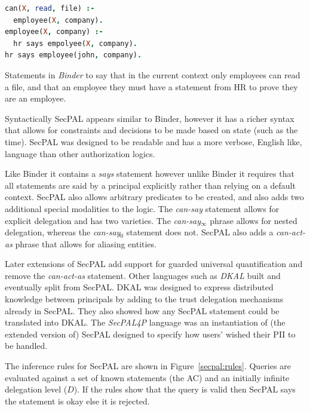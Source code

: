 \documentclass[a4paper,sfsidenotes]{tufte-book}
\begin{document}
\begin{marginfigure}\label{code:binder}
  \begin{lstlisting}[language=Prolog,morekeywords={*,says,:-}]
can(X, read, file) :- 
  employee(X, company).
employee(X, company) :- 
  hr says empolyee(X, company).
hr says employee(john, company).
  \end{lstlisting}
  \caption{Statements in \emph{Binder} to say that in the current context only
    employees can read a file, and that an employee they must have a statement
    from HR to prove they are an employee.}
\end{marginfigure}

Syntactically {SecPAL} appears similar to Binder, however it has a richer syntax
that allows for constraints and decisions to be made based on state (such as the
time). {SecPAL} was designed to be readable and has a more verbose, English like,
language than other authorization logics.

Like Binder it contains a \emph{says} statement however unlike Binder it
requires that all statements are said by a principal explicitly rather than
relying on a default context. {SecPAL} also allows arbitrary predicates to be
created, and also adds two additional special modalities to the logic. The
\emph{can-say} statement allows for explicit delegation and has two varieties.
The \emph{can-say$_\infty$} phrase allows for nested delegation, whereas the
\emph{can-say$_0$} statement does not. {SecPAL} also adds a \emph{can-act-as}
phrase that allows for aliasing entities.

Later extensions of {SecPAL}\cite{Becker:2009vt} add support for guarded
universal quantification and remove the \emph{can-act-as} statement. Other
languages such as \emph{DKAL}\cite{Gurevich:2008fz} built and eventually split
from {SecPAL}. DKAL was designed to express distributed knowledge between
principals by adding to the trust delegation mechanisms already in {SecPAL}.
They also showed how any {SecPAL} statement could be translated into {DKAL}.
The \emph{{SecPAL}4P} language\cite{Becker:2009ula} was an instantiation of (the
extended version of) {SecPAL} designed to specify how users' wished their
\ac{PII} to be handled.

The inference rules for SecPAL are shown in Figure~\ref{secpal:rules}. Queries
are evaluated against a set of known statements (the \ac{AC}) and an initially
infinite delegation level ($D$). If the rules show that the query is valid then
SecPAL says the statement is okay else it is rejected.
\end{document}
